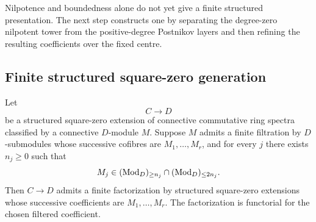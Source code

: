 Nilpotence and boundedness alone do not yet give a finite structured presentation. The
next step constructs one by separating the degree-zero nilpotent tower from the
positive-degree Postnikov layers and then refining the resulting coefficients over the
fixed centre.

\subsection{Finite structured square-zero generation}

\begin{lemma}
\label{lem:refine-square-zero-coefficient-filtration}
Let
\[
    C\longrightarrow D
\]
be a structured square-zero extension of connective commutative ring spectra
classified by a connective \(D\)-module \(M\). Suppose \(M\) admits a finite
filtration by \(D\)-submodules whose successive cofibres are
\(M_1,\ldots,M_r\), and for every \(j\) there exists \(n_j\geq0\) such that
\[
    M_j\in(\operatorname{Mod}_D)_{\geq n_j}\cap(\operatorname{Mod}_D)_{\leq2n_j}.
\]
Then \(C\to D\) admits a finite factorization by structured
square-zero extensions whose successive coefficients are
\(M_1,\ldots,M_r\). The factorization is functorial for the chosen filtered
coefficient.
\end{lemma}

